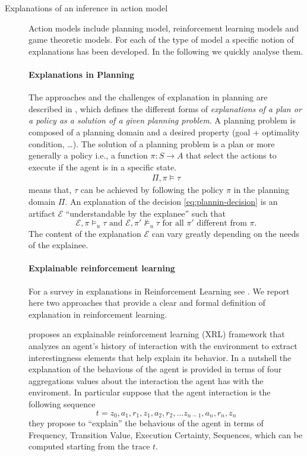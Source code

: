 \begin{description}
  
\item[Explanations of an inference in action model] Action models
  include planning model, reinforcement learning models and game
  theoretic models. For each of the type of model a specific notion of
  explanations has been developed. In the following we quickly analyse
  them.
  
  \paragraph{Explanations in Planning} The approaches and the
  challenges of explanation in planning are described in
  \cite{chakraborti2020emerging}, which defines the different forms of 
  \emph{explanations of a plan or a policy as a solution of a given
    planning problem}. A planning problem is composed of a planning
  domain and a desired property (goal + optimality condition, \dots).
  The solution of a planning problem is a plan or more generally a
  policy i.e., a function $\pi: S\rightarrow A$ that select the
  actions to execute if the agent is in a specific state.
  \begin{align}
    \label{eq:plannin-decision}
  \Pi, \pi\models \tau
  \end{align}
  means that, $\tau$ can be achieved by following the policy $\pi$
  in the planning domain $\Pi$. 
  An explanation of the decision \eqref{eq:plannin-decision} 
  is an artifact $\mathcal{E}$ ``understandable by the explanee'' such that
  $$
  \mathcal{E},\pi\models_u\tau 
  \mbox{ and }
  \mathcal{E},\pi'\not\models_u\tau
  \mbox{ 
    for all $\pi'$ different from $\pi$.}
  $$
  The content of the
  explanation $\mathcal{E}$ can vary greatly depending on the needs of
  the explainee.
  
  \paragraph{Explainable reinforcement learning}
  For a survey in explanations in Reinforcement Learning see
  \cite{puiutta2020explainable}. We report here two approaches that
  provide a clear and formal definition of explanation in
  reinforcement learning. 
  
    \cite{sequeira2019interestingness} proposes an explainable reinforcement learning
    (XRL) framework that analyzes an agent’s history of interaction
    with the environment to extract interestingness elements that help
    explain its behavior. In a nutshell the explanation of the
    behavious of the agent is provided in terms of four aggregations
    values about the interaction the agent has with the enviroment.
    In particular suppose that the agent interaction is the following
    sequence
    $$
    t= z_0,a_1,r_1,z_1,a_2,r_2,\dots z_{n-1},a_n,r_n,z_n
    $$
    they propose to ``explain'' the behavious of the agent in terms of
    Frequency, Transition Value, Execution Certainty, Sequences, which
    can be computed starting from the trace $t$.


\end{description}
